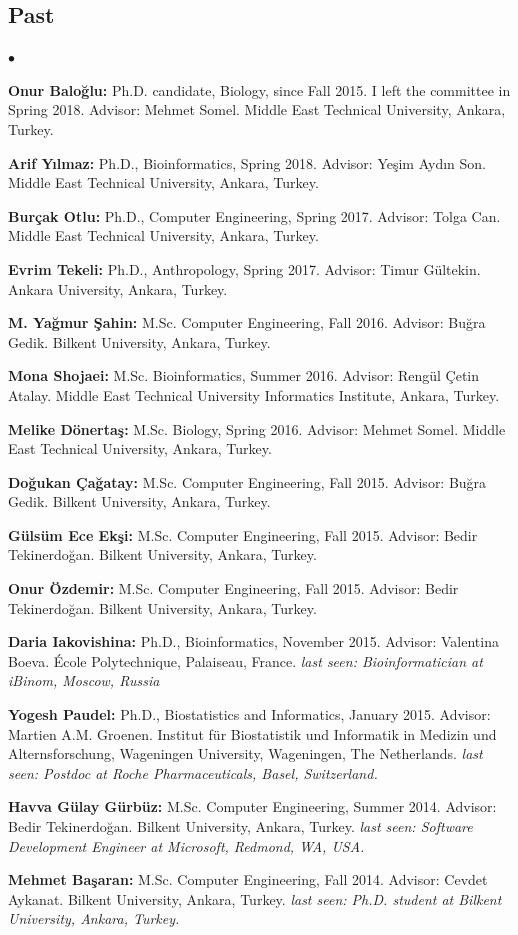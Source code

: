 \documentclass[margin,line]{res}
\newenvironment{list2}{
  \begin{list}{$\bullet$}{%
      \setlength{\itemsep}{0in}
      \setlength{\parsep}{0in} \setlength{\parskip}{0in}
      \setlength{\topsep}{0in} \setlength{\partopsep}{0in} 
      \setlength{\leftmargin}{0.2in}}}{\end{list}}
\begin{document}
\begin{resume}
\subsection{\small \sc Past}
\begin{list2}
\item
  {\bf Onur Baloğlu:} Ph.D. candidate, Biology, since Fall 2015. I left the committee in Spring 2018.
  Advisor: Mehmet Somel.
  Middle East Technical University, Ankara, Turkey.
\item
  {\bf Arif Yılmaz:} Ph.D., Bioinformatics, Spring 2018.
  Advisor: Yeşim Aydın Son.
  Middle East Technical University, Ankara, Turkey.
\item 
  {\bf Burçak Otlu:} Ph.D., Computer Engineering, Spring 2017.
  Advisor: Tolga Can.
  Middle East Technical University, Ankara, Turkey. 
\item 
  {\bf Evrim Tekeli:} Ph.D., Anthropology,  Spring 2017.
  Advisor: Timur G\"{u}ltekin.
  Ankara University, Ankara, Turkey. 
\item
  {\bf M. Yağmur Şahin:} M.Sc. Computer Engineering, Fall 2016. Advisor: Buğra Gedik.
  Bilkent University, Ankara, Turkey. 
\item
  {\bf Mona Shojaei:} M.Sc. Bioinformatics,  Summer 2016. Advisor: Rengül Çetin Atalay.
  Middle East Technical University Informatics Institute, Ankara, Turkey.
\item
  {\bf Melike Dönertaş:} M.Sc. Biology, Spring 2016. Advisor: Mehmet Somel.
  Middle East Technical University, Ankara, Turkey. 
\item
  {\bf Doğukan Çağatay:} M.Sc. Computer Engineering,  Fall 2015. Advisor: Buğra Gedik.
  Bilkent University, Ankara, Turkey. 
\item
  {\bf Gülsüm Ece Ekşi:} M.Sc. Computer Engineering,  Fall 2015. Advisor: Bedir Tekinerdoğan.
  Bilkent University, Ankara, Turkey. 
\item
  {\bf Onur Özdemir:} M.Sc. Computer Engineering,  Fall 2015. Advisor: Bedir Tekinerdoğan.
  Bilkent University, Ankara, Turkey. 
\item
  {\bf Daria Iakovishina:} Ph.D., Bioinformatics,  November 2015.
  Advisor:  Valentina Boeva.
  École Polytechnique, Palaiseau, France.
  {\it last seen: Bioinformatician at iBinom, Moscow, Russia}
\item
  {\bf Yogesh Paudel:} Ph.D., Biostatistics and Informatics,  January 2015.
  Advisor: Martien A.M. Groenen.
  Institut für Biostatistik und Informatik in Medizin und Alternsforschung,  Wageningen University, Wageningen, The Netherlands.
  {\it last seen: Postdoc at Roche Pharmaceuticals, Basel, Switzerland.}
\item
  {\bf Havva Gülay Gürbüz:} M.Sc. Computer Engineering, Summer 2014. Advisor: Bedir Tekinerdoğan.
  Bilkent University, Ankara, Turkey. 
  {\it last seen: Software Development Engineer at Microsoft, Redmond, WA, USA.}
\item
  {\bf Mehmet Başaran:} M.Sc. Computer Engineering, Fall 2014. Advisor: Cevdet Aykanat.
  Bilkent University, Ankara, Turkey. {\it last seen: Ph.D. student at Bilkent University, Ankara, Turkey.}


\end{list2}
\end{resume}
\end{document}
